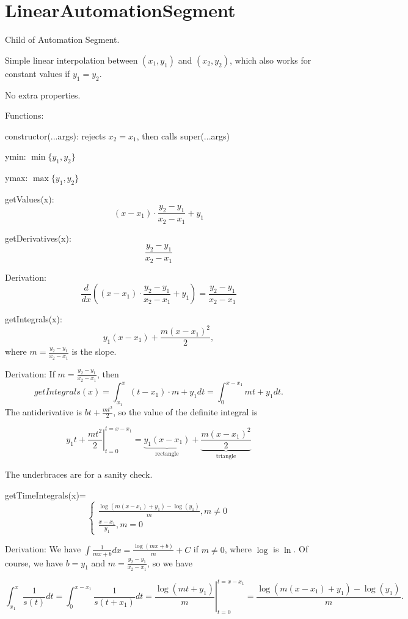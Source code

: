 \documentclass{article}
\begin{document}
\section{LinearAutomationSegment}

Child of Automation Segment.

Simple linear interpolation between $(x_1, y_1)$ and $(x_2, y_2)$, which also works for constant values if $y_1=y_2$.

No extra properties.

Functions:

constructor(...args): rejects $x_2 = x_1$, then calls super(...args)

ymin: $\min\{y_1, y_2\}$

ymax: $\max\{y_1, y_2\}$

getValues(x): $$(x - x_1) \cdot \frac{y_2 - y_1}{x_2 - x_1} + y_1$$

getDerivatives(x): $$\frac{y_2-y_1}{x_2-x_1}$$

Derivation: $$\frac{d}{dx}\left((x - x_1) \cdot \frac{y_2 - y_1}{x_2 - x_1} + y_1\right) = \frac{y_2 - y_1}{x_2 - x_1}$$

getIntegrals(x): $$y_1(x-x_1) + \frac{m(x-x_1)^2}{2},$$ where $m=\frac{y_2 - y_1}{x_2 - x_1}$ is the slope.

Derivation: If $m=\frac{y_2 - y_1}{x_2 - x_1}$, then $$getIntegrals(x) = \int_{x_1}^x (t - x_1) \cdot m + y_1 dt = \int_{0}^{x-x_1} mt + y_1 dt.$$ The antiderivative is $bt + \frac{mt^2}{2}$, so the value of the definite integral is

$$\left. y_1t + \frac{mt^2}{2} \right\vert _ {t=0} ^ {t=x-x_1} = \underbrace{y_1(x-x_1)}_{\text{rectangle}} + \underbrace{\frac{m(x-x_1)^2}{2}}_{\text{triangle}}$$

The underbraces are for a sanity check.

getTimeIntegrals(x)= $$\begin{cases}
\frac{\log(m(x-x_1)+y_1)-\log(y_1)}{m}, m\neq 0 \\
\frac{x-x_1}{y_1}, m = 0
\end{cases}$$

Derivation: We have $\int \frac{1}{mx+b} dx = \frac{\log(mx+b)}{m}+C$ if $m\neq 0$, where $\log$ is $\ln$. Of course, we have $b = y_1$ and $m=\frac{y_2 - y_1}{x_2 - x_1}$, so we have

$$\int_{x_1}^x \frac{1}{s(t)} dt = \int_{0}^{x-x_1} \frac{1}{s(t+x_1)} dt = \left. \frac{\log(mt+y_1)}{m} \right\vert _ {t=0}^{t=x-x_1} = \frac{\log(m(x-x_1)+y_1)-\log(y_1)}{m}.$$
\end{document}
